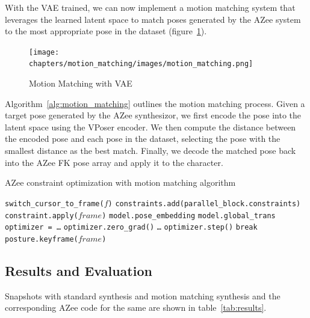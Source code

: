 \documentclass[../../main.tex]{subfiles}
\begin{document}
With the VAE trained, we can now implement a motion matching system that leverages the learned latent space to match poses generated by the AZee system to the most appropriate pose in the dataset (figure~\ref{fig:motion_matching}).

\begin{figure}
  \centering \texttt{[image: chapters/motion\_matching/images/motion\_matching.png]}
  \caption{Motion Matching with VAE}
  \label{fig:motion_matching}
\end{figure}

Algorithm~\ref{alg:motion_matching} outlines the motion matching process. Given a target pose generated by the AZee synthesizor, we first encode the pose into the latent space using the VPoser encoder. We then compute the distance between the encoded pose and each pose in the dataset, selecting the pose with the smallest distance as the best match. Finally, we decode the matched pose back into the AZee FK pose array and apply it to the character.

\begin{algorithm}
  \caption{AZee constraint optimization with motion matching algorithm}
  \label{alg:motion_matching}
  \begin{algorithmic}[1]
      \State \texttt{switch\_cursor\_to\_frame($f$)}
          \State \texttt{constraints.add(parallel\_block.constraints)}
      \EndFor
          \State \texttt{constraint.apply($frame$)}
      \EndFor
      \State \texttt{model.pose\_embedding}
      \State \texttt{model.global\_trans}
      \State \texttt{optimizer = \dots}
          \State \texttt{optimizer.zero\_grad()}
          \State \texttt{\dots}
          \State \texttt{optimizer.step()}
           \State \texttt{break} \EndIf
      \EndFor
      \State \texttt{posture.keyframe($frame$)}
  \EndFor
  \end{algorithmic}
  \end{algorithm}

\subsection{Results and Evaluation}
\label{ch:motion_matching:motion_matching_with_azee:results}

Snapshots with standard synthesis and motion matching synthesis and the corresponding AZee code for the same are shown in table~\ref{tab:results}.
\end{document}
